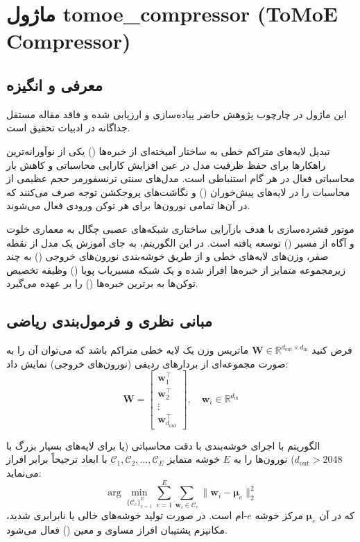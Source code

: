 \section{ماژول tomoe\_compressor (ToMoE Compressor)}
\label{sec:module_tomoe_compressor}

\subsection{معرفی و انگیزه}
این ماژول در چارچوب پژوهش حاضر پیاده‌سازی و ارزیابی شده و فاقد مقاله مستقل جداگانه در ادبیات تحقیق است.

تبدیل لایه‌های متراکم خطی به ساختار آمیخته‌ای از خبره‌ها () یکی از نوآورانه‌ترین راهکارها برای حفظ ظرفیت مدل در عین افزایش کارایی محاسباتی و کاهش بار محاسباتی فعال در هر گام استنباطی است. مدل‌های سنتی ترنسفورمر حجم عظیمی از محاسبات را در لایه‌های پیش‌خوران () و نگاشت‌های پروجکشن توجه صرف می‌کنند که در آن‌ها تمامی نورون‌ها برای هر توکن ورودی فعال می‌شوند.

موتور فشرده‌سازی  با هدف بازآرایی ساختاری شبکه‌های عصبی چگال به معماری خلوت و آگاه از مسیر () توسعه یافته است. در این الگوریتم، به جای آموزش یک مدل  از نقطه صفر، وزن‌های لایه‌های خطی و  از طریق خوشه‌بندی نورون‌های خروجی () به چند زیرمجموعه متمایز از خبره‌ها افراز شده و یک شبکه مسیریاب پویا () وظیفه تخصیص توکن‌ها به برترین خبره‌ها () را بر عهده می‌گیرد.

\subsection{مبانی نظری و فرمول‌بندی ریاضی}
فرض کنید $\mathbf{W} \in \mathbb{R}^{d_{\text{out}} \times d_{\text{in}}}$ ماتریس وزن یک لایه خطی متراکم باشد که می‌توان آن را به صورت مجموعه‌ای از بردارهای ردیفی (نورون‌های خروجی) نمایش داد:
\begin{equation}
\mathbf{W} = \begin{bmatrix} \mathbf{w}_1^\top \\ \mathbf{w}_2^\top \\ \vdots \\ \mathbf{w}_{d_{\text{out}}}^\top \end{bmatrix}, \quad \mathbf{w}_i \in \mathbb{R}^{d_{\text{in}}}
\end{equation}

الگوریتم  با اجرای خوشه‌بندی  با دقت محاسباتی  (یا  برای لایه‌های بسیار بزرگ با $d_{\text{out}} > 2048$) نورون‌ها را به $E$ خوشه متمایز $\mathcal{C}_1, \mathcal{C}_2, \dots, \mathcal{C}_E$ با ابعاد ترجیحاً برابر افراز می‌نماید:
\begin{equation}
\arg\min_{\{\mathcal{C}_e\}_{e=1}^E} \sum_{e=1}^E \sum_{\mathbf{w}_i \in \mathcal{C}_e} \|\mathbf{w}_i - \boldsymbol{\mu}_e\|_2^2
\end{equation}
که در آن $\boldsymbol{\mu}_e$ مرکز خوشه $e$-ام است. در صورت تولید خوشه‌های خالی یا نابرابری شدید، مکانیزم پشتیبان افراز مساوی و معین () فعال می‌شود.

